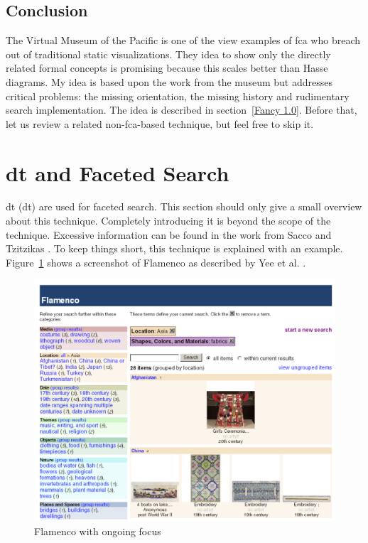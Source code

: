 \documentclass[11pt]{report}
\begin{document}
\subsection{Conclusion}

The Virtual Museum of the Pacific is one of the view examples of \acrshort{fca} who breach out of traditional static visualizations. They idea to show only the directly related formal concepts is promising because this scales better than Hasse diagrams. My idea is based upon the work from the museum but addresses critical problems: the missing orientation, the missing history and rudimentary search implementation. The idea is described in section~\ref{Fancy 1.0}. Before that, let us review a related non-\acrshort{fca}-based technique, but feel free to skip it. \\

\section{\acrlong{dt} and Faceted Search}
\label{dyafs}

\acrlong{dt} (\acrshort{dt}) are used for faceted search. This section should only give a small overview about this technique. Completely introducing it is beyond the scope of the technique. Excessive information can be found in the work from Sacco and Tzitzikas \cite{Sacco2009}. To keep things short, this technique is explained with an example. Figure~\ref{figure:flamenco} shows a screenshot of Flamenco as described by Yee et al. \cite{Yee2003}. \\

\begin{figure}[!ht]
	\centering
	\includegraphics[width=\linewidth]{images/flamenco}
\caption{Flamenco with ongoing focus}
\label{figure:flamenco}
\end{figure}
\end{document}
